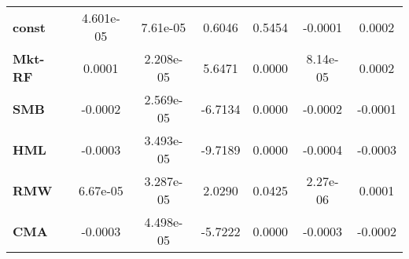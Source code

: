 \begin{center}
\begin{tabular}{lcccccc}
\midrule
\textbf{const}  &     4.601e-05      &      7.61e-05      &      0.6046     &      0.5454      &      -0.0001      &       0.0002       \\
\textbf{Mkt-RF} &       0.0001       &     2.208e-05      &      5.6471     &      0.0000      &      8.14e-05     &       0.0002       \\
\textbf{SMB}    &      -0.0002       &     2.569e-05      &     -6.7134     &      0.0000      &      -0.0002      &      -0.0001       \\
\textbf{HML}    &      -0.0003       &     3.493e-05      &     -9.7189     &      0.0000      &      -0.0004      &      -0.0003       \\
\textbf{RMW}    &      6.67e-05      &     3.287e-05      &      2.0290     &      0.0425      &      2.27e-06     &       0.0001       \\
\textbf{CMA}    &      -0.0003       &     4.498e-05      &     -5.7222     &      0.0000      &      -0.0003      &      -0.0002       \\
\bottomrule
\end{tabular}
\end{center}
